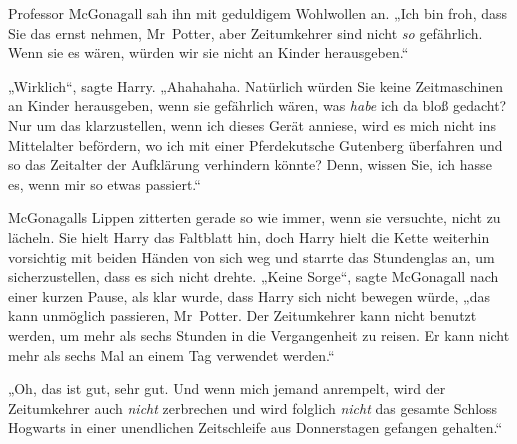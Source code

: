 Professor McGonagall sah ihn mit geduldigem Wohlwollen an.
„Ich bin froh, dass Sie das ernst nehmen, Mr~Potter, aber Zeitumkehrer sind nicht \emph{so} gefährlich. Wenn sie es wären, würden wir sie nicht an Kinder herausgeben.“

„Wirklich“, sagte Harry.
„Ahahahaha. Natürlich würden Sie keine Zeitmaschinen an Kinder herausgeben, wenn sie gefährlich wären, was \emph{habe} ich da bloß gedacht? Nur um das klarzustellen, wenn ich dieses Gerät anniese, wird es mich nicht ins Mittelalter befördern, wo ich mit einer Pferdekutsche Gutenberg überfahren und so das Zeitalter der Aufklärung verhindern könnte? Denn, wissen Sie, ich hasse es, wenn mir so etwas passiert.“

McGonagalls Lippen zitterten gerade so wie immer, wenn sie versuchte, nicht zu lächeln. Sie hielt Harry das Faltblatt hin, doch Harry hielt die Kette weiterhin vorsichtig mit beiden Händen von sich weg und starrte das Stundenglas an, um sicherzustellen, dass es sich nicht drehte.
„Keine Sorge“, sagte McGonagall nach einer kurzen Pause, als klar wurde, dass Harry sich nicht bewegen würde, „das kann unmöglich passieren, Mr~Potter. Der Zeitumkehrer kann nicht benutzt werden, um mehr als sechs Stunden in die Vergangenheit zu reisen. Er kann nicht mehr als sechs Mal an einem Tag verwendet werden.“

„Oh, das ist gut, sehr gut. Und wenn mich jemand anrempelt, wird der Zeitumkehrer auch \emph{nicht} zerbrechen und wird folglich \emph{nicht} das gesamte Schloss Hogwarts in einer unendlichen Zeitschleife aus Donnerstagen gefangen gehalten.“

